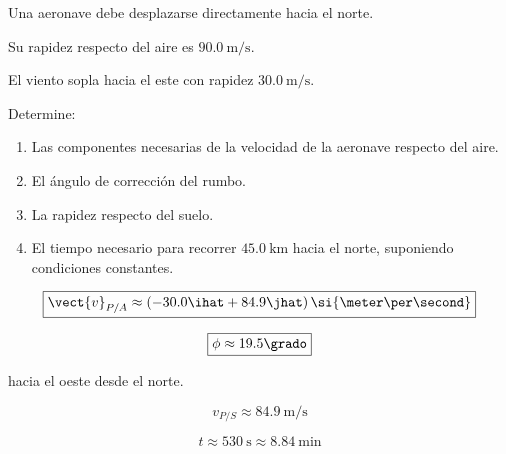 \begin{ejercicio}
Una aeronave debe desplazarse directamente
hacia el norte.

Su rapidez respecto del aire es
\(\SI{90.0}{\meter\per\second}\).

El viento sopla hacia el este con rapidez
\(\SI{30.0}{\meter\per\second}\).

Determine:

\begin{enumerate}[label=\alph*)]
    \item Las componentes necesarias de la velocidad
    de la aeronave respecto del aire.
    \item El ángulo de corrección del rumbo.
    \item La rapidez respecto del suelo.
    \item El tiempo necesario para recorrer
    \(\SI{45.0}{\kilo\meter}\) hacia el norte,
    suponiendo condiciones constantes.
\end{enumerate}
\end{ejercicio}

\begin{respuesta}
\[
\boxed{
\vect{v}_{P/A}
\approx
(-30.0\ihat+84.9\jhat)\,
\si{\meter\per\second}
}
\]

\[
\boxed{
\phi\approx19.5\grado
}
\]

hacia el oeste desde el norte.

\[
\boxed{
v_{P/S}\approx
\SI{84.9}{\meter\per\second}
}
\]

\[
\boxed{
t\approx\SI{530}{\second}
\approx\SI{8.84}{\minute}
}
\]
\end{respuesta}

